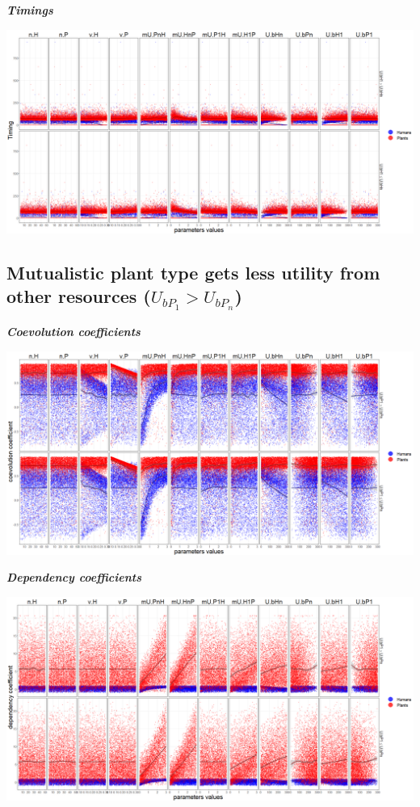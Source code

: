\documentclass[]{book}
\begin{document}
\textbf{\emph{Timings}}

\includegraphics[width=1\linewidth]{plots/5_multiplePar-timing-humanLessBase-ggplot}

\newpage

\hypertarget{mutualistic-plant-type-gets-less-utility-from-other-resources-u_bp_1u_bp_n}{%
\subsection{\texorpdfstring{Mutualistic plant type gets less utility from other resources (\(U_{bP_{1}}>U_{bP_{n}}\))}{Mutualistic plant type gets less utility from other resources (U\_\{bP\_\{1\}\}\textgreater{}U\_\{bP\_\{n\}\})}}\label{mutualistic-plant-type-gets-less-utility-from-other-resources-u_bp_1u_bp_n}}

\textbf{\emph{Coevolution coefficients}}

\includegraphics[width=1\linewidth]{plots/5_multiplePar-coevo-plantLessBase-ggplot}

\textbf{\emph{Dependency coefficients}}

\includegraphics[width=1\linewidth]{plots/5_multiplePar-depend-plantLessBase-ggplot}
\end{document}
